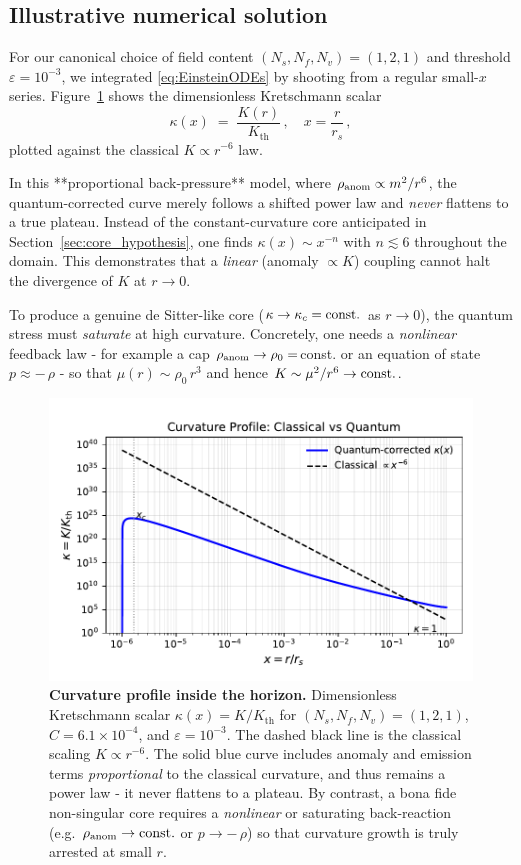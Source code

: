 \subsection{Illustrative numerical solution}
\label{sec:numeric}

For our canonical choice of field content
\((N_s,N_f,N_v)=(1,2,1)\) and threshold 
\(\varepsilon=10^{-3}\), we integrated 
\eqref{eq:EinsteinODEs} by shooting from a regular 
small-\(x\) series. Figure~\ref{fig:Kprofile} shows the 
dimensionless Kretschmann scalar
\[
  \kappa(x)\;=\;\frac{K(r)}{K_{\mathrm{th}}}\,,
  \quad x=\frac{r}{r_s}\,,
\]
plotted against the classical \(K\propto r^{-6}\) law.  

In this **proportional back-pressure** model, where
\(\rho_{\rm anom}\propto m^2/r^6\), the quantum-corrected
curve merely follows a shifted power law and
\emph{never} flattens to a true plateau.  Instead of 
the constant-curvature core anticipated in
Section~\ref{sec:core_hypothesis}, one finds
\(\kappa(x)\sim x^{-n}\) with \(n\lesssim6\) throughout
the domain.  This demonstrates that a \emph{linear}
(anomaly \(\propto K\)) coupling cannot halt the divergence
of \(K\) at \(r\to0\).

To produce a genuine de Sitter-like core
(\(\kappa\to\kappa_c={\rm const.}\) as \(r\to0\)),
the quantum stress must \emph{saturate} at high curvature.
Concretely, one needs a \emph{nonlinear} feedback law
- for example a cap \(\rho_{\rm anom}\to\rho_0=\)const.
or an equation of state \(p\approx-\,\rho\) - so that
\(\mu(r)\sim\rho_0\,r^3\) and hence
\(K\sim\mu^2/r^6\to{\rm const.}\).

\begin{figure}[t]
  \centering
  \includegraphics[width=0.68\linewidth]{figs/Kprofile_combined.pdf}
  \caption{\textbf{Curvature profile inside the horizon.}
    Dimensionless Kretschmann scalar
    \(\kappa(x)=K/K_{\mathrm{th}}\) for 
    \((N_s,N_f,N_v)=(1,2,1)\), \(C=6.1\times10^{-4}\),
    and \(\varepsilon=10^{-3}\).  The dashed black line
    is the classical scaling \(K\propto r^{-6}\).  The
    solid blue curve includes anomaly and emission
    terms \emph{proportional} to the classical curvature,
    and thus remains a power law - it never flattens to
    a plateau.  By contrast, a bona fide non-singular core
    requires a \emph{nonlinear} or saturating back-reaction
    (e.g.\ \(\rho_{\rm anom}\to{\rm const.}\) or
    \(p\to-\,\rho\)) so that curvature growth is truly
    arrested at small \(r\).}
  \label{fig:Kprofile}
\end{figure}

